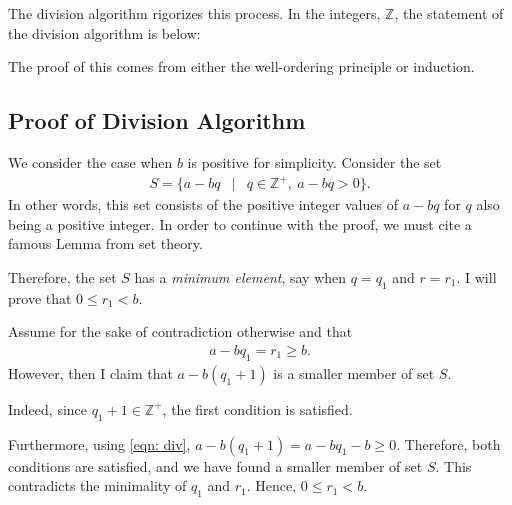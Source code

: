 \clearpage

The division algorithm rigorizes this process. In the integers, $\mathbb{Z}$, the statement of the division algorithm is below:


The proof of this comes from either the well-ordering principle or induction.

\subsection{Proof of Division Algorithm}

We consider the case when $b$ is positive for simplicity.  Consider the set \begin{eqnarray*} S=\{a-bq &|& q \in \mathbb{Z}^{+},\:a-bq>0\}. \end{eqnarray*}  
In other words, this set consists of the positive integer values of $a-bq$ for $q$ also being a positive integer.  In order to continue with the proof, we must cite a famous Lemma from set theory.  

\clearpage

Therefore, the set $S$ has a \textit{minimum element}, say when $q=q_1$ and $r=r_1$. I will prove that $0\le r_1<b.$  

Assume for the sake of contradiction otherwise and that \begin{eqnarray} a-bq_1=r_1\ge b. \label{eqn: div} \end{eqnarray} However, then I claim that $a-b(q_1+1)$ is a smaller member of set $S$. 

Indeed, since $q_1+1\in \mathbb{Z}^{+}$, the first condition is satisfied.

Furthermore, using \ref{eqn: div}, $a-b(q_1+1)=a-bq_1-b\ge 0$. Therefore, both conditions are satisfied, and we have found a smaller member of set $S$. This contradicts the minimality of $q_1$ and $r_1$.  Hence, $0\le r_1<b$.  

